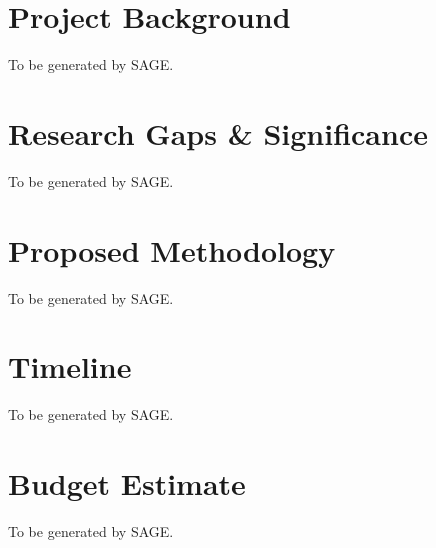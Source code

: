 %

\section{Project Background}
To be generated by SAGE.

\section{Research Gaps \& Significance}
To be generated by SAGE.

\section{Proposed Methodology}
To be generated by SAGE.

\section{Timeline}
To be generated by SAGE.

\section{Budget Estimate}
To be generated by SAGE.
